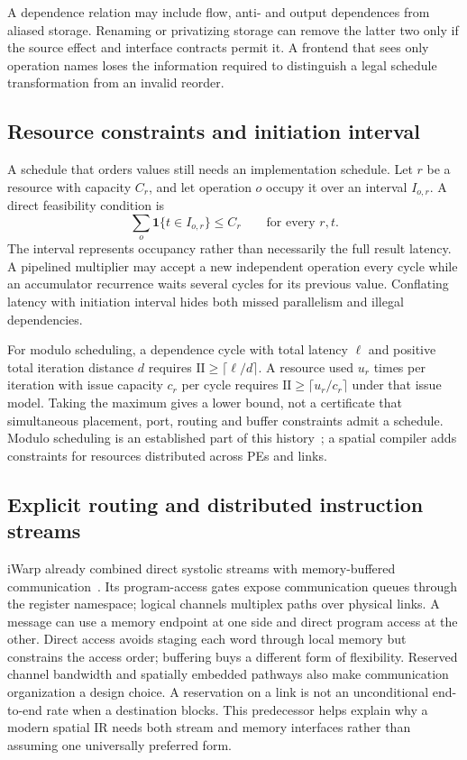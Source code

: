 \documentclass[final,3p,times,authoryear]{elsarticle}
\begin{document}
A dependence relation may include flow, anti- and output dependences from aliased storage. Renaming or privatizing storage can remove the latter two only if the source effect and interface contracts permit it. A frontend that sees only operation names loses the information required to distinguish a legal schedule transformation from an invalid reorder.

\subsection{Resource constraints and initiation interval}
A schedule that orders values still needs an implementation schedule. Let $r$ be a resource with capacity $C_r$, and let operation $o$ occupy it over an interval $I_{o,r}$. A direct feasibility condition is
\begin{equation}\label{eq:resource}
 \sum_o \mathbf1\{t\in I_{o,r}\}\le C_r\qquad\text{for every }r,t.
\end{equation}
The interval represents occupancy rather than necessarily the full result latency. A pipelined multiplier may accept a new independent operation every cycle while an accumulator recurrence waits several cycles for its previous value. Conflating latency with initiation interval hides both missed parallelism and illegal dependencies.

For modulo scheduling, a dependence cycle with total latency $\ell$ and positive total iteration distance $d$ requires $\mathrm{II}\ge\lceil\ell/d\rceil$. A resource used $u_r$ times per iteration with issue capacity $c_r$ per cycle requires $\mathrm{II}\ge\lceil u_r/c_r\rceil$ under that issue model. Taking the maximum gives a lower bound, not a certificate that simultaneous placement, port, routing and buffer constraints admit a schedule. Modulo scheduling is an established part of this history~\citep{rau1994}; a spatial compiler adds constraints for resources distributed across PEs and links.

\subsection{Explicit routing and distributed instruction streams}
iWarp already combined direct systolic streams with memory-buffered communication~\citep{borkar1990}. Its program-access gates expose communication queues through the register namespace; logical channels multiplex paths over physical links. A message can use a memory endpoint at one side and direct program access at the other. Direct access avoids staging each word through local memory but constrains the access order; buffering buys a different form of flexibility. Reserved channel bandwidth and spatially embedded pathways also make communication organization a design choice. A reservation on a link is not an unconditional end-to-end rate when a destination blocks. This predecessor helps explain why a modern spatial IR needs both stream and memory interfaces rather than assuming one universally preferred form.
\end{document}
